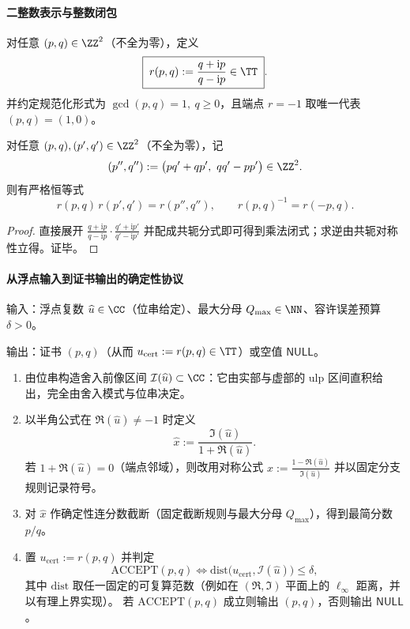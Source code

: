 \paragraph{二整数表示与整数闭包}
\begin{definition}\label{def:unitary-two-integer-certificate}
对任意 \((p,q)\in\ZZ^{2}\)（不全为零），定义
\begin{equation}\label{eq:unitary-two-integer-map}
\boxed{\;
r(p,q):=\frac{q+\mathrm{i}p}{q-\mathrm{i}p}\in\TT\; }.
\end{equation}
并约定规范化形式为
\(
\gcd(p,q)=1,\ q\ge 0
\)，且端点 \(r=-1\) 取唯一代表 \((p,q)=(1,0)\)。
\end{definition}

\begin{proposition}[单位圆乘法在二整数表示下闭合]\label{prop:unitary-two-integer-closure}
对任意 \((p,q),(p',q')\in\ZZ^{2}\)（不全为零），记
\[
(p'',q''):=\bigl(pq'+qp',\ qq'-pp'\bigr)\in\ZZ^{2}.
\]
则有严格恒等式
\[
r(p,q)\,r(p',q')=r(p'',q''),
\qquad
r(p,q)^{-1}=r(-p,q).
\]
\end{proposition}
\begin{proof}
直接展开
\(
\frac{q+\mathrm{i}p}{q-\mathrm{i}p}\cdot\frac{q'+\mathrm{i}p'}{q'-\mathrm{i}p'}
\)
并配成共轭分式即可得到乘法闭式；求逆由共轭对称性立得。证毕。
\end{proof}

\paragraph{从浮点输入到证书输出的确定性协议}
\begin{algorithm}\label{alg:unitary-two-integer-deterministic}
输入：浮点复数 \(\widehat u\in\CC\)（位串给定）、最大分母 \(Q_{\max}\in\NN\)、容许误差预算 \(\delta>0\)。

\smallskip
\noindent 输出：证书 \((p,q)\)（从而 \(u_{\mathrm{cert}}:=r(p,q)\in\TT\)）或空值 \(\mathsf{NULL}\)。
\begin{enumerate}
  \item 由位串构造舍入前像区间 \(\mathcal{I}(\widehat u)\subset\CC\)：它由实部与虚部的 ulp 区间直积给出，完全由舍入模式与位串决定。
  \item 以半角公式在 \(\Re(\widehat u)\neq-1\) 时定义
  \[
  \widehat x:=\frac{\Im(\widehat u)}{1+\Re(\widehat u)}.
  \]
  若 \(1+\Re(\widehat u)=0\)（端点邻域），则改用对称公式
  \(
  \widehat x:=\frac{1-\Re(\widehat u)}{\Im(\widehat u)}
  \)
  并以固定分支规则记录符号。
  \item 对 \(\widehat x\) 作确定性连分数截断（固定截断规则与最大分母 \(Q_{\max}\)），得到最简分数 \(p/q\)。
  \item 置 \(u_{\mathrm{cert}}:=r(p,q)\) 并判定
  \[
  \mathrm{ACCEPT}(p,q)\Longleftrightarrow
  \mathrm{dist}\bigl(u_{\mathrm{cert}},\mathcal{I}(\widehat u)\bigr)\le\delta,
  \]
  其中 \(\mathrm{dist}\) 取任一固定的可复算范数（例如在 \((\Re,\Im)\) 平面上的 \(\ell_{\infty}\) 距离，并以有理上界实现）。
  若 \(\mathrm{ACCEPT}(p,q)\) 成立则输出 \((p,q)\)，否则输出 \(\mathsf{NULL}\)。
\end{enumerate}
\end{algorithm}

